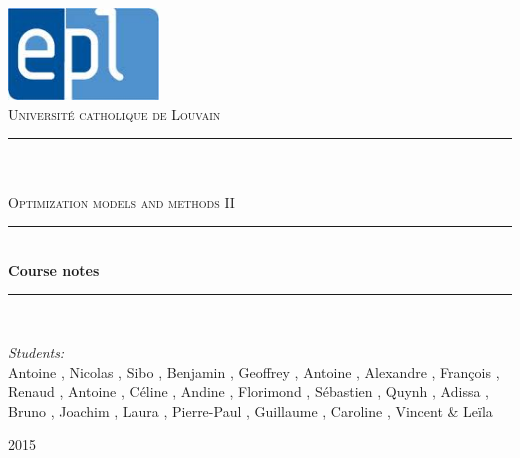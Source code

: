 \newcommand{\HRule}{\rule{\linewidth}{0.5mm}}

\begin{titlepage}
	
\begin{center}

\includegraphics[width=0.30\textwidth]{images/epl.jpg}\\[1cm]    

\textsc{\LARGE Universit\'e catholique de Louvain}\\[1.5cm]

\HRule \\[0.5cm]

\textsc{\Large {}}\\[0.2cm]
\textsc{\Large Optimization models and methods II}\\[0.5cm]


\HRule \\[2cm]
{\huge \bfseries Course notes}\\[1cm]

\HRule \\[1.5cm]

\begin{minipage}{0.8\textwidth}
\large
\emph{Students:}\\
Antoine , Nicolas , Sibo , Benjamin , Geoffrey , Antoine , Alexandre , François , Renaud , Antoine , Céline , Andine , Florimond , Sébastien , Quynh , Adissa , Bruno , Joachim , Laura , Pierre-Paul , Guillaume , Caroline , Vincent   \& Leïla 






\end{minipage}







\vfill

{\large  2015}

\end{center}	
	
	
\end{titlepage}
